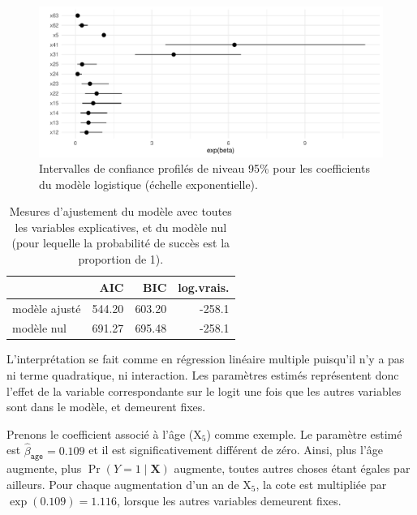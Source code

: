 \documentclass[
  11pt,
  letterpaper,
]{scrbook}
\theoremstyle{definition}
\theoremstyle{remark}
\begin{document}
\begin{figure}[ht!]

{\centering \includegraphics[width=1\textwidth,height=\textheight]{reglogistique_files/figure-pdf/fig-confint-modele2-logist-1.pdf}

}

\caption{\label{fig-confint-modele2-logist}Intervalles de confiance
profilés de niveau 95\% pour les coefficients du modèle logistique
(échelle exponentielle).}

\end{figure}

\hypertarget{tbl-gof-logist1}{}
\begin{table}
\caption{\label{tbl-gof-logist1}Mesures d'ajustement du modèle avec toutes les variables explicatives,
et du modèle nul (pour lequelle la probabilité de succès est la
proportion de 1). }\tabularnewline

\centering
\begin{tabular}{lrrr}
\toprule
  & AIC & BIC & log.vrais.\\
\midrule
modèle ajusté & 544.20 & 603.20 & -258.1\\
modèle nul & 691.27 & 695.48 & -258.1\\
\bottomrule
\end{tabular}
\end{table}

L'interprétation se fait comme en régression linéaire multiple puisqu'il
n'y a pas ni terme quadratique, ni interaction. Les paramètres estimés
représentent donc l'effet de la variable correspondante sur le logit une
fois que les autres variables sont dans le modèle, et demeurent fixes.

Prenons le coefficient associé à l'âge (\(\mathrm{X}_5\)) comme exemple.
Le paramètre estimé est \(\widehat{\beta}_{\texttt{age}}=0.109\) et il
est significativement différent de zéro. Ainsi, plus l'âge augmente,
plus \(\Pr(Y=1\mid \mathbf{X})\) augmente, toutes autres choses étant
égales par ailleurs. Pour chaque augmentation d'un an de
\(\mathrm{X}_5\), la cote est multipliée par \(\exp(0.109)=1.116\),
lorsque les autres variables demeurent fixes.
\end{document}
